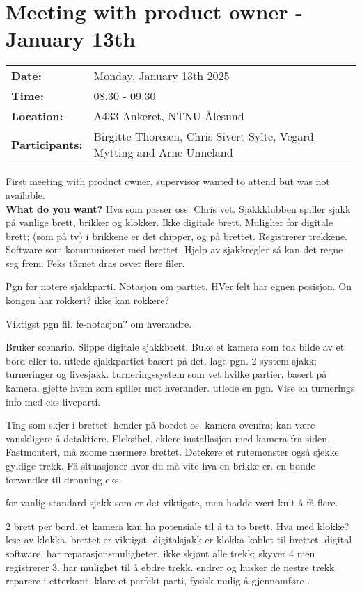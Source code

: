 \section{Meeting with product owner - January 13th}
\begin{tabular}{ll}
    \textbf{Date:} & Monday, January 13th 2025 \\
    \textbf{Time:} & 08.30 - 09.30\\
    \textbf{Location:} & A433 Ankeret, NTNU Ålesund \\
    \textbf{Participants:} & Birgitte Thoresen, Chris Sivert Sylte, Vegard Mytting and Arne Unneland\\
\end{tabular}

\vspace{0.5cm}

First meeting with product owner, supervisor wanted to attend but was not available.\\

\textbf{What do you want?}
Hva som passer oss. Chris vet. Sjakkklubben spiller sjakk på vanlige brett, brikker og klokker. Ikke digitale brett. Muligher for digitale brett; (som på tv) i brikkene er det chipper, og på brettet. Registrerer trekkene. Software som kommuniserer med brettet. Hjelp av sjakkregler så kan det regne seg frem. Feks tårnet dras osver flere filer. 

Pgn for notere sjakkparti. Notasjon om partiet. HVer felt har egnen posisjon. On kongen har rokkert? ikke kan rokkere? 

Viktigst pgn fil. fe-notasjon? om hverandre. 

Bruker scenario. Slippe digitale sjakkbrett. Buke et kamera som tok bilde av et bord eller to. utlede sjakkpartiet basert på det. lage pgn. 2 system sjakk; turneringer og livesjakk. turneringssystem som vet hvilke partier, basert på kamera. gjette hvem som spiller mot hverander. utlede en pgn. Vise en turnerings info med eks liveparti. 

Ting som skjer i brettet. hender på bordet os. kamera ovenfra; kan være vanskligere å detaktiere. Fleksibel. eklere installasjon med kamera fra siden. Fastmontert, må zoome nærmere brettet. Detekere et rutemønster også sjekke gyldige trekk. Få situasjoner hvor du må vite hva en brikke er. en bonde forvandler til dronning eks.  

for vanlig standard sjakk som er det viktigste, men hadde vært kult å få flere. 

2 brett per bord. et kamera kan ha potensiale til å ta to brett. Hva med klokke? lese av klokka. brettet er viktigst. digitalsjakk er klokka koblet til brettet. digital software, har reparasjonsmuligheter. ikke skjønt alle trekk; skyver 4 men registrerer 3. har mulighet til å ebdre trekk. endrer og husker de nestre trekk.  reparere i etterkant. klare et perfekt parti, fysisk mulig å gjennomføre . 

